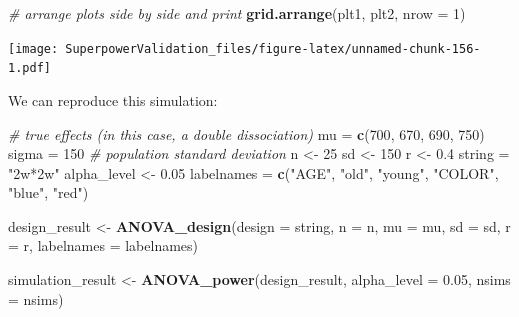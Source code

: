 \documentclass[]{book}
\newenvironment{Shaded}{\begin{snugshade}}{\end{snugshade}}
\newcommand{\CommentTok}[1]{\textcolor[rgb]{0.56,0.35,0.01}{\textit{#1}}}
\newcommand{\DataTypeTok}[1]{\textcolor[rgb]{0.13,0.29,0.53}{#1}}
\newcommand{\DecValTok}[1]{\textcolor[rgb]{0.00,0.00,0.81}{#1}}
\newcommand{\FloatTok}[1]{\textcolor[rgb]{0.00,0.00,0.81}{#1}}
\newcommand{\KeywordTok}[1]{\textcolor[rgb]{0.13,0.29,0.53}{\textbf{#1}}}
\newcommand{\NormalTok}[1]{#1}
\newcommand{\StringTok}[1]{\textcolor[rgb]{0.31,0.60,0.02}{#1}}
\begin{document}
\begin{Shaded}
\begin{Highlighting}[]
\CommentTok{# arrange plots side by side and print}
\KeywordTok{grid.arrange}\NormalTok{(plt1, plt2, }\DataTypeTok{nrow =} \DecValTok{1}\NormalTok{)}
\end{Highlighting}
\end{Shaded}

\texttt{[image: SuperpowerValidation\_files/figure-latex/unnamed-chunk-156-1.pdf]}

We can reproduce this simulation:

\begin{Shaded}
\begin{Highlighting}[]
\CommentTok{# true effects (in this case, a double dissociation)}
\NormalTok{mu =}\StringTok{ }\KeywordTok{c}\NormalTok{(}\DecValTok{700}\NormalTok{, }\DecValTok{670}\NormalTok{, }\DecValTok{690}\NormalTok{, }\DecValTok{750}\NormalTok{) }
\NormalTok{sigma =}\StringTok{ }\DecValTok{150}  \CommentTok{# population standard deviation}
\NormalTok{n <-}\StringTok{ }\DecValTok{25}
\NormalTok{sd <-}\StringTok{ }\DecValTok{150}
\NormalTok{r <-}\StringTok{ }\FloatTok{0.4}
\NormalTok{string =}\StringTok{ "2w*2w"}
\NormalTok{alpha_level <-}\StringTok{ }\FloatTok{0.05}
\NormalTok{labelnames =}\StringTok{ }\KeywordTok{c}\NormalTok{(}\StringTok{"AGE"}\NormalTok{, }\StringTok{"old"}\NormalTok{, }\StringTok{"young"}\NormalTok{, }
               \StringTok{"COLOR"}\NormalTok{, }\StringTok{"blue"}\NormalTok{, }\StringTok{"red"}\NormalTok{)}

\NormalTok{design_result <-}\StringTok{ }\KeywordTok{ANOVA_design}\NormalTok{(}\DataTypeTok{design =}\NormalTok{ string,}
                              \DataTypeTok{n =}\NormalTok{ n, }
                              \DataTypeTok{mu =}\NormalTok{ mu, }
                              \DataTypeTok{sd =}\NormalTok{ sd, }
                              \DataTypeTok{r =}\NormalTok{ r, }
                              \DataTypeTok{labelnames =}\NormalTok{ labelnames)}
\end{Highlighting}
\end{Shaded}

\begin{Shaded}
\begin{Highlighting}[]
\NormalTok{simulation_result <-}\StringTok{ }\KeywordTok{ANOVA_power}\NormalTok{(design_result, }
                                 \DataTypeTok{alpha_level =} \FloatTok{0.05}\NormalTok{, }
                                 \DataTypeTok{nsims =}\NormalTok{ nsims)}
\end{Highlighting}
\end{Shaded}
\end{document}
